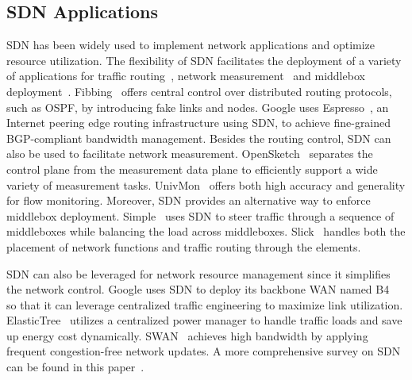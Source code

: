 \subsection{SDN Applications}
\label{sec:sdn:apps}

SDN has been widely used to implement network applications and optimize resource utilization. The flexibility of SDN facilitates the deployment of a variety of applications for traffic routing{~\cite{fibbing, espresso}}, network measurement{~\cite{univmon, opensketch}} and middlebox deployment{~\cite{simple, slick}}. Fibbing{~\cite{fibbing}} offers central control over distributed routing protocols, such as OSPF, by introducing fake links and nodes. Google uses Espresso{~\cite{espresso}}, an Internet peering edge routing infrastructure using SDN, to achieve fine-grained BGP-compliant bandwidth management. Besides the routing control, SDN can also be used to facilitate network measurement. OpenSketch{~\cite{opensketch}} separates the control plane from the measurement data plane to efficiently support a wide variety of measurement tasks. UnivMon{~\cite{univmon}} offers both high accuracy and generality for flow monitoring. Moreover, SDN provides an alternative way to enforce middlebox deployment. Simple{~\cite{simple}} uses SDN to steer traffic through a sequence of middleboxes while balancing the load across middleboxes. Slick{~\cite{slick}} handles both the placement of network functions and traffic routing through the elements.


SDN can also be leveraged for network resource management since it simplifies the network control. Google uses SDN to deploy its backbone WAN named B4{~\cite{b4}} so that it can leverage centralized traffic engineering to maximize link utilization. ElasticTree{~\cite{elastic}} utilizes a centralized power manager to handle traffic loads and save up energy cost dynamically. SWAN{~\cite{swan}} achieves high bandwidth by applying frequent congestion-free network updates. A more comprehensive survey on SDN can be found in this paper{~\cite{sdnsurvey}}.





